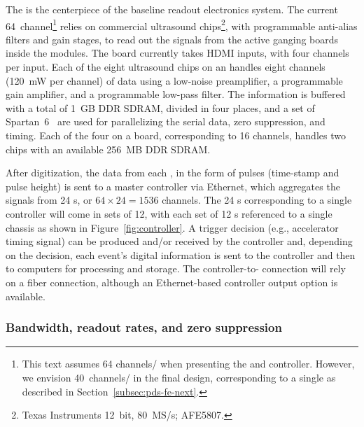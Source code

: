 The  is the centerpiece of the baseline readout electronics system.  
The current 64~channel\footnote{This text assumes 64 channels/ when presenting the  and controller. However, we envision 40~channels/ in the final design, corresponding to a single  as described in Section~\ref{subsec:pds-fe-next}.}  relies on commercial ultrasound chips\footnote{Texas Instruments\texttrademark{} 12~bit, 80~MS/s; AFE5807.},
with programmable anti-alias filters and gain stages, to read out the  signals from the active ganging boards inside the  modules. The board currently takes HDMI inputs, with four channels per input.  Each of the eight ultrasound chips on an  handles eight channels (\SI{120}{mW} per channel) of data using a low-noise preamplifier, a programmable gain amplifier, and a programmable low-pass filter. The information is buffered with a total of \SI{1}{GB} DDR SDRAM, divided in four places, and a set of Spartan~6\texttrademark~ are used for parallelizing the serial  data, zero suppression, and timing. Each of the four  on a board, corresponding to 16 channels, handles two  chips with an available \SI{256}{MB} DDR SDRAM. 

After digitization, the data from each , in the form of pulses (time-stamp and pulse height) is sent to a master controller via Ethernet, which aggregates the signals from 24 s, or $64\times24=1536$ channels. The 24 s corresponding to a single controller will come in sets of 12, with each set of 12 s referenced to a single chassis as shown in %
Figure~\ref{fig:controller}. A trigger decision (e.g., accelerator timing signal) can be produced and/or received by the controller and, depending on the decision, each event's digital information is sent to the controller and then to  computers for processing and storage. The controller-to- connection will rely on a fiber connection, although an Ethernet-based controller output option is available.

\subsubsection{Bandwidth, readout rates, and zero suppression}

